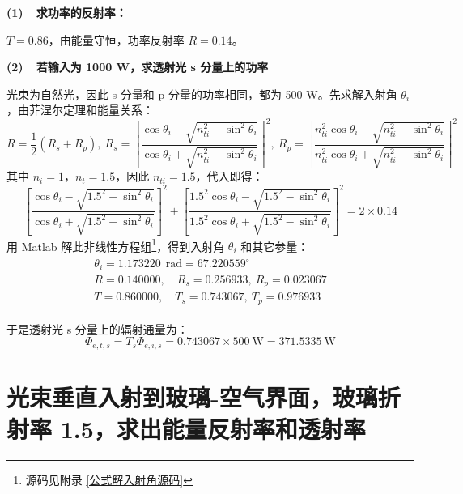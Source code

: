\documentclass[UTF8]{report}
\theoremstyle{MyLineTheoremStyle} %
\theoremstyle{MyBlockTheoremStyle} %
\theoremstyle{MySubsubsectionStyle} %
\begin{document}
\textbf{(1)\ \ 求功率的反射率：}

$T = 0.86$，由能量守恒，功率反射率 $R = 0.14$。

\textbf{(2)\ \ 若输入为 1000 W，求透射光 s 分量上的功率}

光束为自然光，因此 s 分量和 p 分量的功率相同，都为 500 W。先求解入射角 $\theta_i$，由菲涅尔定理和能量关系：
\begin{equation}
R =  \frac{1}{2}(R_s + R_p),\  R_s =  \left[ \frac{ \cos \theta_i - \sqrt{n_{ti}^2 - \sin^2 \theta_i} }{\cos \theta_i + \sqrt{n_{ti}^2 - \sin^2 \theta_i}} \right]^2,\ R_p = \left[ \frac{ n_{ti}^2\cos \theta_i - \sqrt{n_{ti}^2 - \sin^2 \theta_i} }{n_{ti}^2\cos \theta_i + \sqrt{n_{ti}^2 - \sin^2 \theta_i}} \right]^2
\end{equation}
其中 $n_i = 1$，$n_t = 1.5$，因此 $n_{ti} = 1.5$，代入即得：
\begin{equation}
    \left[ \frac{ \cos \theta_i - \sqrt{1.5^2 - \sin^2 \theta_i} }{\cos \theta_i + \sqrt{1.5^2 - \sin^2 \theta_i}} \right]^2 + \left[ \frac{ 1.5^2\cos \theta_i - \sqrt{1.5^2 - \sin^2 \theta_i} }{1.5^2\cos \theta_i + \sqrt{1.5^2 - \sin^2 \theta_i}} \right]^2 = 2\times0.14
\end{equation}
用 Matlab 解此非线性方程组\footnote{源码见附录 \ref{公式解入射角源码}}，得到入射角 $\theta_i$ 和其它参量：
\begin{gather}\label{解入射角}
\begin{matrix}
    \theta_i =  1.173220\ \ \mathrm{rad}  = 67.220559^\circ \\
    R = 0.140000,\quad   R_s = 0.256933,\    R_p = 0.023067 \\ 
    T = 0.860000,\quad   T_s = 0.743067,\    T_p = 0.976933
\end{matrix}
\end{gather}

于是透射光 s 分量上的辐射通量为：
\begin{equation}
\Phi_{e,t,s} = T_s \Phi_{e,i,s} = 0.743067 \times 500 \ \mathrm{W} =  371.5335 \ \mathrm{W}
\end{equation}


\section{光束垂直入射到玻璃-空气界面，玻璃折射率 1.5，求出能量反射率和透射率}
\end{document}
